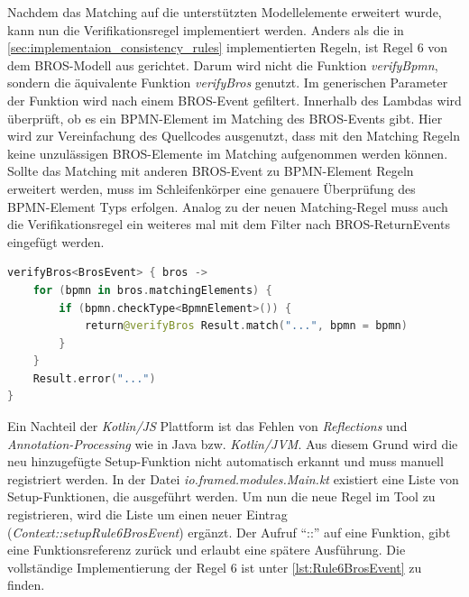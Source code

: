 Nachdem das Matching auf die unterstützten Modellelemente erweitert wurde, kann nun die Verifikationsregel implementiert werden.
Anders als die in \cref{sec:implementaion_consistency_rules} implementierten Regeln, ist Regel 6 von dem BROS-Modell aus gerichtet.
Darum wird nicht die Funktion \emph{verifyBpmn}, sondern die äquivalente Funktion \emph{verifyBros} genutzt.
Im generischen Parameter der Funktion wird nach einem BROS-Event gefiltert.
Innerhalb des Lambdas wird überprüft, ob es ein BPMN-Element im Matching des BROS-Events gibt.
Hier wird zur Vereinfachung des Quellcodes ausgenutzt, dass mit den Matching Regeln keine unzulässigen BROS-Elemente im Matching aufgenommen werden können.
Sollte das Matching mit anderen BROS-Event zu BPMN-Element Regeln erweitert werden, muss im Schleifenkörper eine genauere Überprüfung des BPMN-Element Typs erfolgen.
Analog zu der neuen Matching-Regel muss auch die Verifikationsregel ein weiteres mal mit dem Filter nach BROS-ReturnEvents eingefügt werden.

\begin{lstlisting}[language=Kotlin, caption=Implementierung von Regel 6, label=lst:implementation_rule_6]
verifyBros<BrosEvent> { bros ->
    for (bpmn in bros.matchingElements) {
        if (bpmn.checkType<BpmnElement>()) {
            return@verifyBros Result.match("...", bpmn = bpmn)
        }
    }
    Result.error("...")
}
\end{lstlisting}

Ein Nachteil der \emph{Kotlin/JS} Plattform ist das Fehlen von \emph{Reflections} und \emph{Annotation-Processing} wie in Java bzw. \emph{Kotlin/JVM}.
Aus diesem Grund wird die neu hinzugefügte Setup-Funktion nicht automatisch erkannt und muss manuell registriert werden.
In der Datei \emph{io.framed.modules.Main.kt} existiert eine Liste von Setup-Funktionen, die ausgeführt werden.
Um nun die neue Regel im Tool zu registrieren, wird die Liste um einen neuer Eintrag (\emph{Context::setupRule6BrosEvent}) ergänzt.
Der Aufruf ``::'' auf eine Funktion, gibt eine Funktionsreferenz zurück und erlaubt eine spätere Ausführung.
Die vollständige Implementierung der Regel 6 ist unter \cref{lst:Rule6BrosEvent} zu finden.
